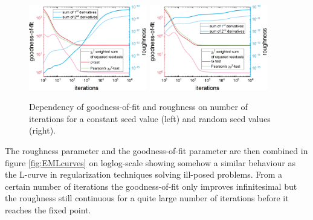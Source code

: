 \begin{figure}[htb]
\centering
\includegraphics[width=0.46\textwidth]{../images/form_factor/EM/EMconstant_seed_smooth_0_0_goodness_of_fit.png}
\hspace{0.06\textwidth}
\includegraphics[width=0.46\textwidth]{../images/form_factor/EM/EMrandom_seed_smooth_0_0_goodness_of_fit.png}
\caption{Dependency of goodness-of-fit and roughness on number of iterations for a constant seed value (left) and random seed values (right).\label{fig:EMgoodness_smooth_evolution}}
\end{figure}

The roughness parameter and the goodness-of-fit parameter are then combined in figure \ref{fig:EMLcurves} on loglog-scale showing somehow a similar behaviour as the L-curve in regularization techniques solving ill-posed problems. From a certain number of iterations the goodness-of-fit only improves infinitesimal but the roughness still continuous for a quite large number of iterations before it reaches the fixed point.

